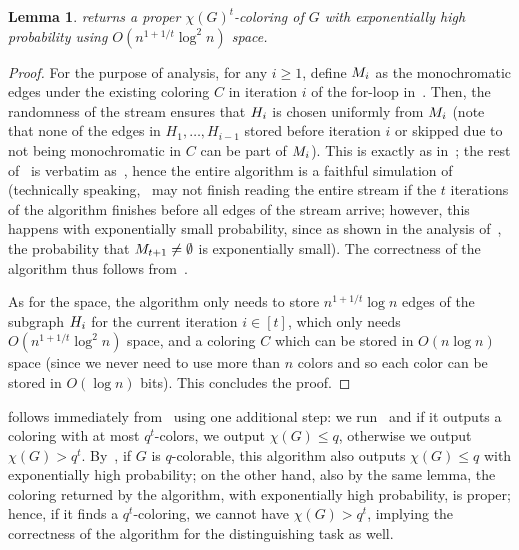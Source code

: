 \documentclass[11pt]{article}
\newtheorem{lemma}{Lemma}[section]
\theoremstyle{definition}
\renewcommand{\leq}{\leqslant}
\renewcommand{\geq}{\geqslant}
\begin{document}
\begin{lemma}\label{lem:alg-random-order}
	 returns a proper $\chi(G)^t$-coloring of $G$ with exponentially high probability using $O(n^{1+1/t}\log^2{n})$ space. 
\end{lemma}
\begin{proof}

For the purpose of analysis, for any $i \geq 1$, define $M_{i}$ as the monochromatic edges under the existing coloring $C$ in iteration $i$ of the for-loop in~.  
Then, the randomness of the stream ensures that $H_{i}$ is chosen uniformly from $M_{i}$ (note that none of the edges in $H_1,\ldots,H_{i-1}$ stored before iteration $i$ or skipped due to not being monochromatic in $C$ can be part of $M_{i}$). 
This is exactly as in~; the rest of~ is verbatim as~, hence the entire algorithm is a faithful simulation of~ (technically speaking,~ 
may not finish reading the entire stream if the $t$ iterations of the algorithm finishes before all edges of the stream arrive; however, this happens with exponentially small probability, since as shown in the analysis of~, the probability that $
M_{t+1} \neq \emptyset$ is exponentially small). The correctness of the algorithm thus follows from~. 

As for the space, the algorithm only needs to store $n^{1+1/t}\log{n}$ edges of the subgraph $H_{i}$ for the current iteration $i \in [t]$, which only needs $O(n^{1+1/t}\log^2{n})$ space, and a coloring $C$ which can be stored in $O(n\log{n})$ space (since we never need
to use more than $n$ colors and so each color can be stored in $O(\log{n})$ bits). This concludes the proof. 
\end{proof}

 follows immediately from~ using one additional step: we run~ and if it outputs a coloring with at most $q^t$-colors, we output $\chi(G) \leq q$, otherwise we output $\chi(G) > q^t$. 
By~, if $G$ is $q$-colorable, this algorithm also outputs $\chi(G) \leq q$ with exponentially high probability; on the other hand, also by the same lemma, the coloring 
returned by the algorithm, with exponentially high probability, is proper; hence, if it finds a $q^t$-coloring, we cannot have $\chi(G) > q^t$, implying the correctness of the algorithm for the distinguishing task as well.  
\end{document}
